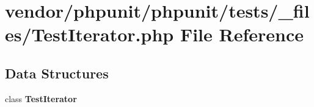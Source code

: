 \section{vendor/phpunit/phpunit/tests/\+\_\+files/\+Test\+Iterator.php File Reference}
\label{_test_iterator_8php}
\subsection*{Data Structures}
\begin{DoxyCompactItemize}
\item 
class {\bf Test\+Iterator}
\end{DoxyCompactItemize}
